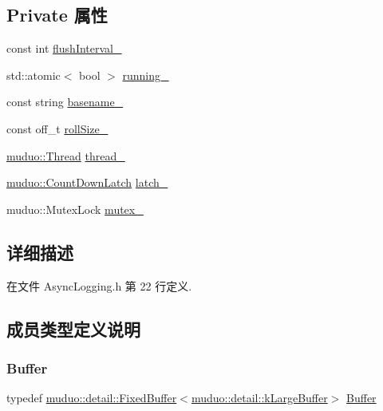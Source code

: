 \subsection*{Private 属性}
\begin{DoxyCompactItemize}
\item 
const int \hyperlink{classmuduo_1_1AsyncLogging_a5014f30709157722cd5b45a4096add3b}{flush\+Interval\+\_\+}
\item 
std\+::atomic$<$ bool $>$ \hyperlink{classmuduo_1_1AsyncLogging_aa9620a15c76ada2388bf678e373a6463}{running\+\_\+}
\item 
const string \hyperlink{classmuduo_1_1AsyncLogging_a13e75d6811d8c75146c98ff19a60aaa2}{basename\+\_\+}
\item 
const off\+\_\+t \hyperlink{classmuduo_1_1AsyncLogging_a72b49897d1dce777946cab0186c07b3b}{roll\+Size\+\_\+}
\item 
\hyperlink{classmuduo_1_1Thread}{muduo\+::\+Thread} \hyperlink{classmuduo_1_1AsyncLogging_aa0093f2535e4d8943878c3a5b626f730}{thread\+\_\+}
\item 
\hyperlink{classmuduo_1_1CountDownLatch}{muduo\+::\+Count\+Down\+Latch} \hyperlink{classmuduo_1_1AsyncLogging_a5f6680165faf06c40899d9cc24c5bcd0}{latch\+\_\+}
\item 
muduo\+::\+Mutex\+Lock \hyperlink{classmuduo_1_1AsyncLogging_ab9ed43ba5a78211f8947e85d98e1dffb}{mutex\+\_\+}
\end{DoxyCompactItemize}


\subsection{详细描述}


在文件 Async\+Logging.\+h 第 22 行定义.



\subsection{成员类型定义说明}
\mbox{\label{classmuduo_1_1AsyncLogging_a663de001c958343ca7cdf3d35a77159a}} 
\subsubsection{\texorpdfstring{Buffer}{Buffer}}
{\footnotesize\ttfamily typedef \hyperlink{classmuduo_1_1detail_1_1FixedBuffer}{muduo\+::detail\+::\+Fixed\+Buffer}$<$\hyperlink{namespacemuduo_1_1detail_a72d89caa2e467f089bb6cc480d73b884}{muduo\+::detail\+::k\+Large\+Buffer}$>$ \hyperlink{classmuduo_1_1AsyncLogging_a663de001c958343ca7cdf3d35a77159a}{Buffer}\hspace{0.3cm}{\ttfamily [private]}}



